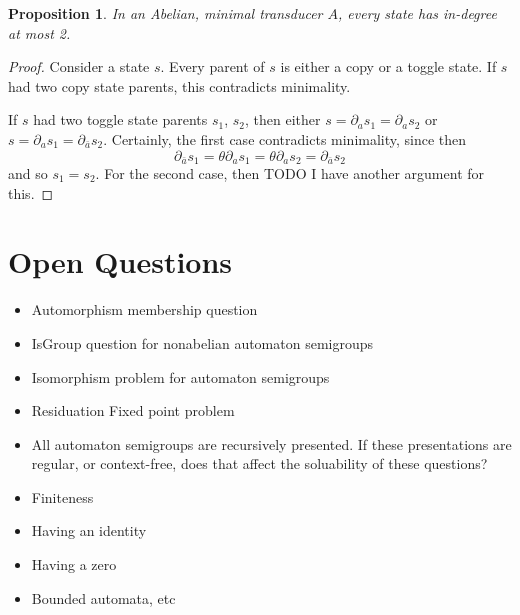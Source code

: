 \documentclass[10pt,a4paper]{article} %
\theoremstyle{pleasant}
\newtheorem{proposition}{Proposition}
\begin{document}
    \begin{proposition}
    In an Abelian, minimal transducer $A$, every state has in-degree at most 2.
    \end{proposition}
    \begin{proof}
    Consider a state $s$. Every parent of $s$ is either a copy or a toggle state. If $s$ had two copy state parents, this contradicts minimality. 
    
    If $s$ had two toggle state parents $s_1$, $s_2$, then either $s = \partial_a s_1 = \partial_a s_2$ or $s = \partial_a s_1 = \partial_{\bar{a}} s_2$. Certainly, the first case contradicts minimality, since then 
    $$ \partial_{\bar{a}} s_1 = \theta \partial_a s_1 = \theta \partial_a s_2 = \partial_{\bar{a}} s_2$$
    and so $s_1 = s_2$.
    For the second case, then TODO I have another argument for this.
    \end{proof}

    \section{Open Questions} 

    \begin{itemize}
    \item Automorphism membership question
    \item IsGroup question for nonabelian automaton semigroups
    \item Isomorphism problem for automaton semigroups
    \item Residuation Fixed point problem
    \item All automaton semigroups are recursively presented. If these presentations are regular, or context-free, does that affect the soluability of these questions?
    \item Finiteness
    \item Having an identity
    \item Having a zero
    \item Bounded automata, etc
    \end{itemize}
    
    \nocite{*}
    
    
\end{document}
